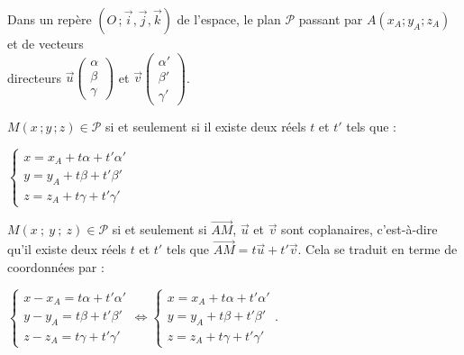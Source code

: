 \documentclass{cornouaille}
\begin{document}
\begin{propriete}
  Dans un  repère $(O\,;\vec{i},\vec{j},\vec{k})$  de l'espace, le plan
  $\mathscr{P}$ passant par $A(x_A;y_A;z_A)$ et de vecteurs\\ directeurs
  $\vec{u} \begin {pmatrix} \alpha\\\beta\\\gamma \end{pmatrix}$ et
  $\vec{v} \begin {pmatrix} \alpha'\\\beta'\\\gamma' \end{pmatrix}$. 

  $M(x\,;y\,;z)\in \mathscr{P}$ si et seulement si il existe deux réels
  $t$ et $t'$ tels que :
  \begin{center}
    $\begin{cases}
      x=x_A+t\alpha+t'\alpha' \\
      y=y_A+t\beta +t'\beta'  \\
      z=z_A+t\gamma +t'\gamma' 
    \end{cases}$
  \end{center}
\end{propriete}

\begin{preuve}
  $M(x\ ;\ y\ ;\ z)\in \mathscr{P}$ si et seulement si
  $\overrightarrow{AM}$, $\vec{u}$ et $\vec{v}$ sont coplanaires,
  c'est-à-dire qu'il existe deux réels $t$ et $t'$ tels que
  $\overrightarrow{AM}=t\overrightarrow{u}+t'\overrightarrow{v}$.
  Cela se traduit en terme de coordonnées par :
\begin{center}
  $\begin{cases}x-x_A=t\alpha+t'\alpha' \\
    y-y_A=t\beta +t'\beta' \\
    z-z_A=t\gamma + t'\gamma'
  \end{cases}
  \Leftrightarrow
  \begin{cases}
    x=x_A+t\alpha+t'\alpha' \\
    y=y_A+t\beta +t'\beta' \\
    z=z_A+t\gamma +t'\gamma' 
  \end{cases}$.
\end{center}
\end{preuve}
\end{document}
